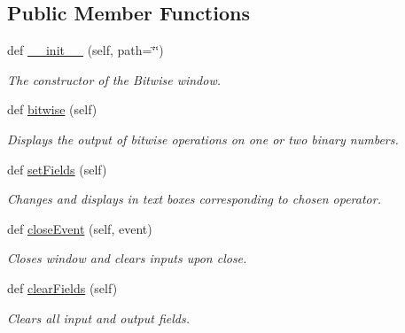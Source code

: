 \subsection*{Public Member Functions}
\begin{DoxyCompactItemize}
\item 
def \hyperlink{classbitwise__ui_1_1_bitwise_window_a5f91a64a61e0cd5282e40925c4417171}{\+\_\+\+\_\+init\+\_\+\+\_\+} (self, path=\char`\"{}\char`\"{})
\begin{DoxyCompactList}\small\item\em The constructor of the Bitwise window. \end{DoxyCompactList}\item 
def \hyperlink{classbitwise__ui_1_1_bitwise_window_a3eafe17fad0d129cd2bbab0d84e0e450}{bitwise} (self)
\begin{DoxyCompactList}\small\item\em Displays the output of bitwise operations on one or two binary numbers. \end{DoxyCompactList}\item 
\mbox{\label{classbitwise__ui_1_1_bitwise_window_a1ff53a3a4a2ecbfe3bcf3b6485f4758e}} 
def \hyperlink{classbitwise__ui_1_1_bitwise_window_a1ff53a3a4a2ecbfe3bcf3b6485f4758e}{set\+Fields} (self)
\begin{DoxyCompactList}\small\item\em Changes and displays in text boxes corresponding to chosen operator. \end{DoxyCompactList}\item 
\mbox{\label{classbitwise__ui_1_1_bitwise_window_a5fcf727d9271519cbe76fff538ff42b7}} 
def \hyperlink{classbitwise__ui_1_1_bitwise_window_a5fcf727d9271519cbe76fff538ff42b7}{close\+Event} (self, event)
\begin{DoxyCompactList}\small\item\em Closes window and clears inputs upon close. \end{DoxyCompactList}\item 
\mbox{\label{classbitwise__ui_1_1_bitwise_window_a19e6fbad04a799221f0d29e689a14069}} 
def \hyperlink{classbitwise__ui_1_1_bitwise_window_a19e6fbad04a799221f0d29e689a14069}{clear\+Fields} (self)
\begin{DoxyCompactList}\small\item\em Clears all input and output fields. \end{DoxyCompactList}\end{DoxyCompactItemize}

